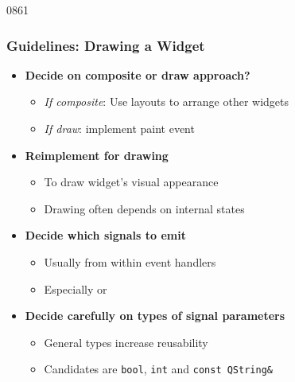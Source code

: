 \begin{slide}{0861}\frametitle{Guidelines: Drawing a Widget}
\begin{itemize}
\item \textbf{Decide on composite or draw approach?}
  \begin{itemize}
  \item \textit{If composite}: Use layouts to arrange other widgets
  \item \textit{If draw}: implement paint event
  \end{itemize}

\item \textbf{Reimplement  for drawing}
  \begin{itemize}
  \item To draw widget's visual appearance
  \item Drawing often depends on internal states
  \end{itemize}
\item \textbf{Decide which signals to emit}
  \begin{itemize}
  \item Usually from within event handlers
  \item Especially  or 
  \end{itemize}
\item \textbf{Decide carefully on types of signal parameters}
  \begin{itemize}
  \item General types increase reusability
  \item Candidates are \texttt{bool}, \texttt{int} and \texttt{const QString\&}
  \end{itemize}
\end{itemize}
\end{slide}
